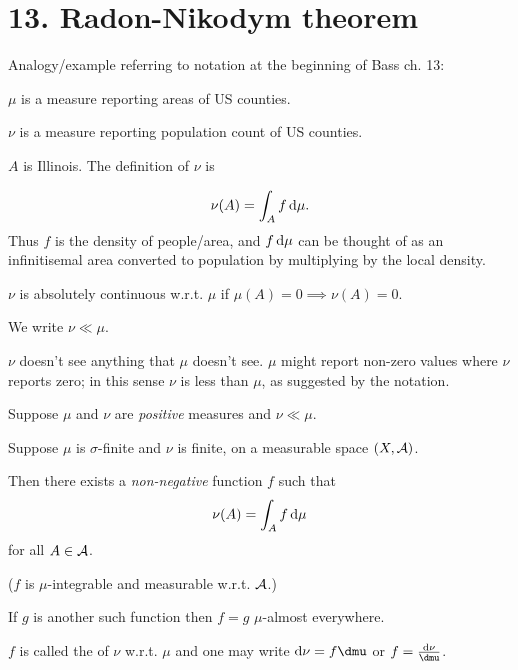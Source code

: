 \section{13. Radon-Nikodym theorem}

Analogy/example referring to notation at the beginning of Bass ch. 13:

$\mu$ is a measure reporting areas of US counties.

$\nu$ is a measure reporting population count of US counties.

$A$ is Illinois. The definition of $\nu$ is

\begin{align*}
  \nu(A) = \int_A f \d\mu.
\end{align*}
Thus $f$ is the density of people/area, and $f\d\mu$ can be thought of as an infinitisemal area
converted to population by multiplying by the local density.

\begin{definition}
  $\nu$ is absolutely continuous w.r.t. $\mu$ if $\mu(A) = 0 \implies \nu(A) = 0$.

  We write $\nu \ll \mu$.
\end{definition}

\begin{intuition}
  $\nu$ doesn't see anything that $\mu$ doesn't see​. $\mu$ might report non-zero values where
  $\nu$ reports zero; in this sense $\nu$ is less than $\mu$, as suggested by the notation.
\end{intuition}

\begin{theorem}
  Suppose $\mu$ and $\nu$ are {\it positive} measures and $\nu \ll \mu$.

  Suppose $\mu$ is $\sigma$-finite and $\nu$ is finite, on a measurable space $(X, \mathcal A)$.

  Then there exists a {\it non-negative} function $f$ such that
  \begin{align*}
  \nu(A) = \int_A f \d\mu
  \end{align*}
  for all $A \in \mathcal A$.

  ($f$ is $\mu$-integrable and measurable w.r.t. $\mathcal A$.)

  If $g$ is another such function then $f = g$ $\mu$-almost everywhere.

  $f$ is called the  of $\nu$ w.r.t. $\mu$ and one may write
  $\d\nu = f\dmu$ or $f = \frac{\d\nu}{\dmu}$.
\end{theorem}

